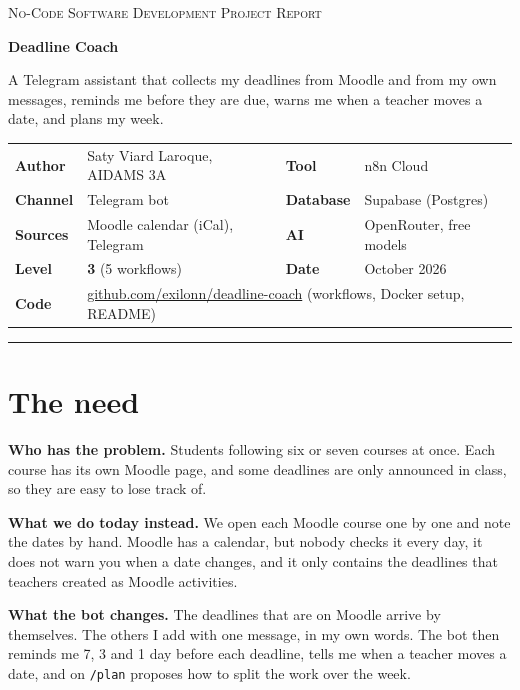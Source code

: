 \documentclass[10pt,a4paper]{article}
\newcommand{\cmd}[1]{\texttt{\small #1}}
\begin{document}
{\footnotesize\color{muted}\textsc{No-Code Software Development \textperiodcentered{} Project Report}}\par\vspace{2pt}
{\LARGE\bfseries Deadline Coach}\par\vspace{2pt}
{\normalsize A Telegram assistant that collects my deadlines from Moodle and from my own messages,
reminds me before they are due, warns me when a teacher moves a date, and plans my week.}\par\vspace{6pt}

\begin{tabularx}{\linewidth}{@{}l X l X@{}}
\textbf{Author} & Saty Viard Laroque, AIDAMS 3A & \textbf{Tool} & n8n Cloud \\
\textbf{Channel} & Telegram bot & \textbf{Database} & Supabase (Postgres) \\
\textbf{Sources} & Moodle calendar (iCal), Telegram & \textbf{AI} & OpenRouter, free models \\
\textbf{Level} & \textbf{3} (5 workflows) & \textbf{Date} & October 2026 \\
\textbf{Code} & \multicolumn{3}{l}{\href{https://github.com/exilonn/deadline-coach}{github.com/exilonn/deadline-coach} (workflows, Docker setup, README)} \\
\end{tabularx}

\vspace{2pt}
{\color{ink!20}\rule{\linewidth}{0.6pt}}

\section{The need}

\textbf{Who has the problem.} Students following six or seven courses at once. Each course has its own Moodle page, and
some deadlines are only announced in class, so they are easy to lose track of.

\textbf{What we do today instead.} We open each Moodle course one by one and note the dates by hand.
Moodle has a calendar, but nobody checks it every day, it does not warn you when a date changes, and it only contains
the deadlines that teachers created as Moodle activities.

\textbf{What the bot changes.} The deadlines that are on Moodle arrive by themselves. The others I add with one
message, in my own words. The bot then reminds me 7, 3 and 1 day before each deadline, tells me when a teacher moves a
date, and on \cmd{/plan} proposes how to split the work over the week.
\end{document}
